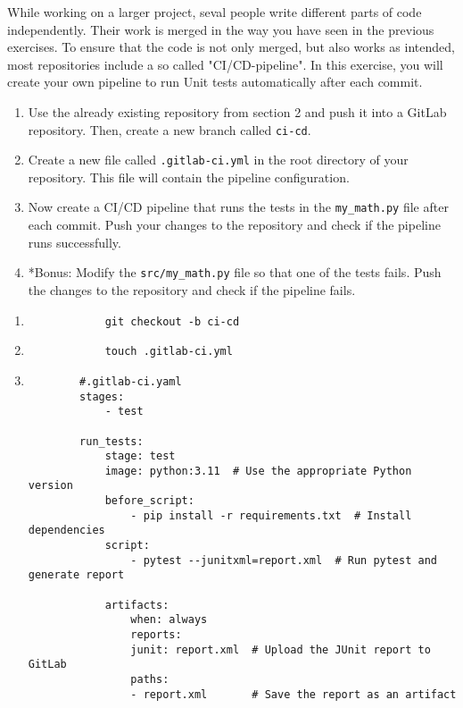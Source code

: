 \documentclass[english]{sheet}
\begin{document}
\begin{exercise}
    While working on a larger project, seval people write different parts of code independently. Their work is merged in the way you have seen in the previous exercises. To ensure that the code is not only merged, but also works as intended, most repositories include a so called "CI/CD-pipeline". In this exercise, you will create your own pipeline to run Unit tests automatically after each commit.

    \begin{enumerate}
		\item Use the already existing repository from section 2 and push it into a GitLab repository. Then, create a new branch called \texttt{ci-cd}.
		\item Create a new file called \texttt{.gitlab-ci.yml} in the root directory of your repository. This file will contain the pipeline configuration.
		\item Now create a CI/CD pipeline that runs the tests in the \texttt{my_math.py} file after each commit. Push your changes to the repository and check if the pipeline runs successfully.
		\item *Bonus: Modify the \texttt{src/my_math.py} file so that one of the tests fails. Push the changes to the repository and check if the pipeline fails.
	\end{enumerate}
\end{exercise}

\begin{solution}
	\begin{enumerate}
		\item \begin{verbatim}
			git checkout -b ci-cd
		\end{verbatim}
		\item \begin{verbatim}
			touch .gitlab-ci.yml
		\end{verbatim}
		\item \begin{verbatim}
		#.gitlab-ci.yaml
		stages:
			- test

		run_tests:
			stage: test
			image: python:3.11  # Use the appropriate Python version
			before_script:
				- pip install -r requirements.txt  # Install dependencies  
			script:
				- pytest --junitxml=report.xml  # Run pytest and generate report

			artifacts:
				when: always
				reports:
				junit: report.xml  # Upload the JUnit report to GitLab
				paths:
				- report.xml       # Save the report as an artifact

		\end{verbatim}
	\end{enumerate}
\end{solution}
\end{document}
